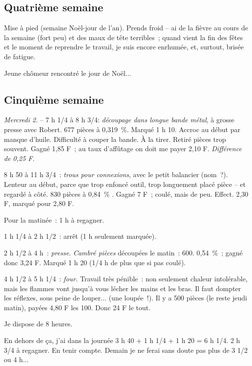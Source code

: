 \documentclass[french,twoside]{book} %
\begin{document}
\subsection[Quatrième semaine]{Quatrième semaine}
\noindent \par
Mise à pied (semaine Noël-jour de l'an). Prends froid – ai de la fièvre au cours de la semaine (fort peu) et des maux de tête terribles ; quand vient la fin des fêtes et le moment de reprendre le travail, je suis encore enrhumée, et, surtout, brisée de fatigue.\par
Jeune chômeur rencontré le jour de Noël...
\subsection[Cinquième semaine]{Cinquième semaine}
\noindent \par
{\itshape Mercredi 2}. – 7 h 1/4 à 8 h 3/4: {\itshape découpage dans longue bande métal}, à grosse presse avec Robert. 677 pièces à 0,319 \%. Marqué 1 h 10. Accroc au début par manque d'huile. Difficulté à couper la bande. À la tirer. Retiré pièces trop souvent. Gagné 1,85 F ; au taux d'affûtage on doit me payer 2,10 F. {\itshape Différence de 0,25 F.}\par
8 h 50 à 11 h 3/4 : {\itshape trous pour connexions}, avec le petit balancier (nom ?). Lenteur au début, parce que trop enfoncé outil, trop longuement placé pièce – et regardé à côté. 830 pièces à 0,84 \% . Gagné 7 F ; coulé, mais de peu. Effect. 2,30 F, marqué pour 2,80 F.\par
Pour la matinée : 1 h à regagner.\par
1 h 1/4 à 2 h 1/2 : arrêt (1 h seulement marquée).\par
2 h 1/2 à 4 h : {\itshape presse}. {\itshape Cambré pièces} découpées le matin : 600. 0,54 \% ; gagné donc 3,24 F. Marqué 1 h 20 (1/4 h de plus que si pas coulé).\par
4 h 1/2 à 5 h 1/4 : {\itshape four.} Travail très pénible : non seulement chaleur intolérable, mais les flammes vont jusqu'à vous lécher les mains et les bras. Il faut dompter les réflexes, sous peine de louper... (une loupée !). Il y a 500 pièces (le reste jeudi matin), payées 4,80 F les 100. Donc 24 F le tout.\par
Je dispose de 8 heures.\par
En dehors de ça, j'ai dans la journée 3 h 40 + 1 h 1/4 + 1 h 20 = 6 h 1/4. 2 h 3/4 à regagner. En tenir compte. Demain je ne ferai sans doute pas plus de 3 1/2 ou 4 h...\par
\end{document}

